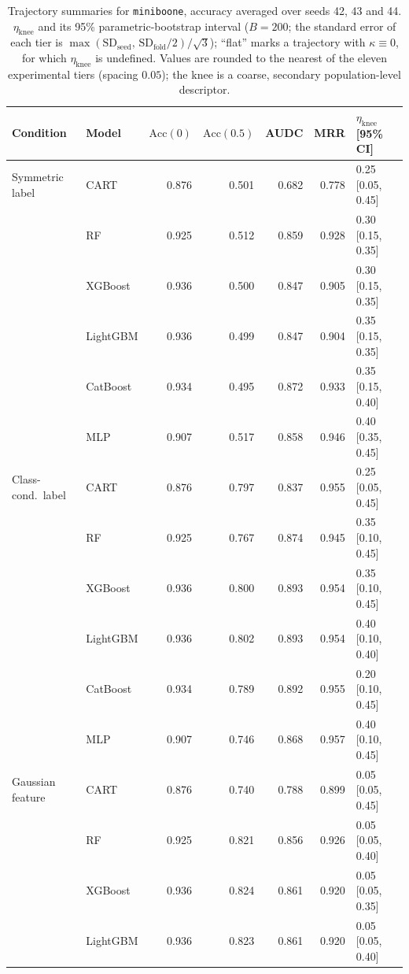 \documentclass[pdflatex,sn-mathphys]{sn-jnl}
\theoremstyle{thmstyleone}
\begin{document}
\begin{table}[htbp]
\centering
\scriptsize
\setlength{\tabcolsep}{3.5pt}
\caption{Trajectory summaries for \texttt{miniboone}, accuracy averaged over seeds 42, 43 and 44. $\eta_{\mathrm{knee}}$ and its 95\% parametric-bootstrap interval ($B=200$; the standard error of each tier is $\max(\mathrm{SD}_{\mathrm{seed}},\,\mathrm{SD}_{\mathrm{fold}}/2)/\sqrt3$); ``flat'' marks a trajectory with $\kappa\equiv 0$, for which $\eta_{\mathrm{knee}}$ is undefined. Values are rounded to the nearest of the eleven experimental tiers (spacing $0.05$); the knee is a coarse, secondary population-level descriptor.}
\label{tab:traj_miniboone}
\begin{tabular}{@{}llrrrrl@{}}
\toprule
Condition & Model & $\mathrm{Acc}(0)$ & $\mathrm{Acc}(0.5)$ & AUDC & MRR & $\eta_{\mathrm{knee}}$ [95\% CI] \\
\midrule
Symmetric label & CART & 0.876 & 0.501 & 0.682 & 0.778 & 0.25 [0.05, 0.45] \\
 & RF & 0.925 & 0.512 & 0.859 & 0.928 & 0.30 [0.15, 0.35] \\
 & XGBoost & 0.936 & 0.500 & 0.847 & 0.905 & 0.30 [0.15, 0.35] \\
 & LightGBM & 0.936 & 0.499 & 0.847 & 0.904 & 0.35 [0.15, 0.35] \\
 & CatBoost & 0.934 & 0.495 & 0.872 & 0.933 & 0.35 [0.15, 0.40] \\
 & MLP & 0.907 & 0.517 & 0.858 & 0.946 & 0.40 [0.35, 0.45] \\
\midrule
Class-cond.\ label & CART & 0.876 & 0.797 & 0.837 & 0.955 & 0.25 [0.05, 0.45] \\
 & RF & 0.925 & 0.767 & 0.874 & 0.945 & 0.35 [0.10, 0.45] \\
 & XGBoost & 0.936 & 0.800 & 0.893 & 0.954 & 0.35 [0.10, 0.45] \\
 & LightGBM & 0.936 & 0.802 & 0.893 & 0.954 & 0.40 [0.10, 0.40] \\
 & CatBoost & 0.934 & 0.789 & 0.892 & 0.955 & 0.20 [0.10, 0.45] \\
 & MLP & 0.907 & 0.746 & 0.868 & 0.957 & 0.40 [0.10, 0.45] \\
\midrule
Gaussian feature & CART & 0.876 & 0.740 & 0.788 & 0.899 & 0.05 [0.05, 0.45] \\
 & RF & 0.925 & 0.821 & 0.856 & 0.926 & 0.05 [0.05, 0.40] \\
 & XGBoost & 0.936 & 0.824 & 0.861 & 0.920 & 0.05 [0.05, 0.35] \\
 & LightGBM & 0.936 & 0.823 & 0.861 & 0.920 & 0.05 [0.05, 0.40] \\

\end{tabular}
\end{table}
\end{document}
